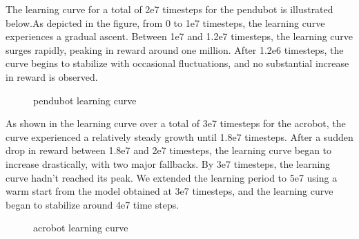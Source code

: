 The learning curve for a total of 2e7 timesteps for the pendubot is illustrated below.As depicted in the figure, from 0 to 1e7 timesteps, the learning curve experiences a gradual ascent. Between 1e7 and 1.2e7 timesteps, the learning curve surges rapidly, peaking in reward around one million. After 1.2e6 timesteps, the curve begins to stabilize with occasional fluctuations, and no substantial increase in reward is observed.

\begin{figure}[H]
    \centering
    \caption{pendubot learning curve}
    \label{fig:image_a}
\end{figure}

As shown in the learning curve over a total of 3e7 timesteps for the acrobot, the curve experienced a relatively steady growth until 1.8e7 timesteps. After a sudden drop in reward between 1.8e7 and 2e7 timesteps, the learning curve began to increase drastically, with two major fallbacks. By 3e7 timesteps, the learning curve hadn't reached its peak. We extended the learning period to 5e7 using a warm start from the model obtained at 3e7 timesteps, and the learning curve began to stabilize around 4e7 time steps.

\begin{figure}[H]
    \centering
    \caption{acrobot learning curve}
    \label{fig:image_b}
\end{figure}

